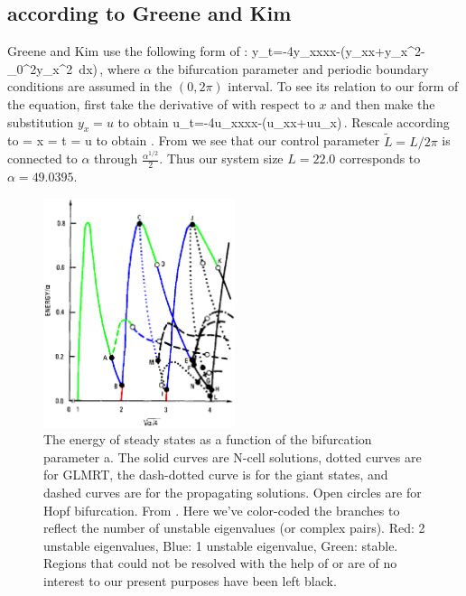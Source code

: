 {\subsection{\KSe according to Greene and Kim}

Greene and Kim  use the following form of \KSe:
\beq
	y_t=-4y_{xxxx}-\alpha\left(y_{xx}+y_x^2-\int_0^{2\pi}y_x^2\ dx\right)\,,
	\label{eq:KSeGreeneKim}
\eeq
where $\alpha$ the bifurcation parameter and periodic boundary conditions are assumed in the $(0,2\pi)$
interval. To see its relation to our form of the equation, first take the derivative of 
with respect to $x$ and then make the substitution $y_x=u$ to obtain
\beq
	u_t=-4u_{xxxx}-\alpha\left(u_{xx}+uu_x\right)\,.
\eeq
Rescale according to
\beq
	= x
	\label{eq:GKxScale}
\eeq
\beq
	= t
\eeq
\beq
	= u
\eeq
to obtain . From  we see that our control parameter $\tilde{L}=L/2\pi$ is connected
to $\alpha$ through $\frac{\alpha^{1/2}}{2}$. Thus our system size $L=22.0$ corresponds to $\alpha=49.0395$.

\begin{figure}[t]
\centering
\includegraphics[width=0.5\textwidth]{figs/GreeneKimBifColor.eps}
\caption{
	{\small
The energy of steady states as a function of the bifurcation
parameter a. The solid curves are N-cell solutions,
dotted curves are for GLMRT, the dash-dotted curve is for the
giant states, and dashed curves are for the propagating solutions.
Open circles are for Hopf bifurcation. From . Here
we've color-coded the branches to reflect the number of unstable
eigenvalues (or complex pairs). Red: 2 unstable eigenvalues, Blue: 1
unstable eigenvalue, Green: stable. Regions that could not be
resolved with the help of  or are of no interest
to our present purposes have been left black.
        } %
        }
\label{fig:GreeneKim}
\end{figure}

}
